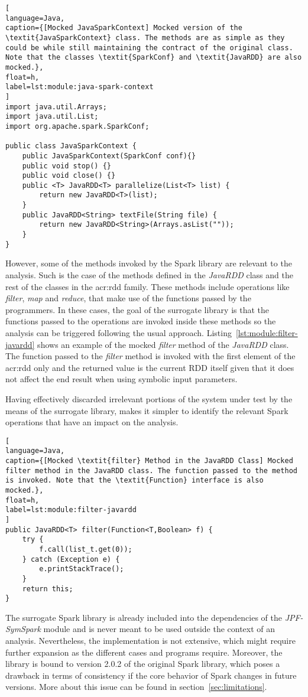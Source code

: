 \begin{lstlisting}[
language=Java,
caption={[Mocked JavaSparkContext] Mocked version of the \textit{JavaSparkContext} class. The methods are as simple as they could be while still maintaining the contract of the original class. Note that the classes \textit{SparkConf} and \textit{JavaRDD} are also mocked.},
float=h,
label=lst:module:java-spark-context
]
import java.util.Arrays;
import java.util.List;
import org.apache.spark.SparkConf;

public class JavaSparkContext {	
	public JavaSparkContext(SparkConf conf){}
	public void stop() {}	
	public void close() {}
	public <T> JavaRDD<T> parallelize(List<T> list) {		
		return new JavaRDD<T>(list);
	}
	public JavaRDD<String> textFile(String file) {
		return new JavaRDD<String>(Arrays.asList(""));
	}
}
\end{lstlisting}

However, some of the methods invoked by the Spark library are relevant to the analysis. Such is the case of the methods defined in the \textit{JavaRDD} class and the rest of the classes in the \acrshort{acr:rdd} family. These methods include operations like \textit{filter}, \textit{map} and \textit{reduce}, that make use of the functions passed by the programmers. In these cases, the goal of the surrogate library is that the functions passed to the operations are invoked inside these methods so the analysis can be triggered following the usual \spf{} approach. Listing~\ref{lst:module:filter-javardd} shows an example of the mocked \textit{filter} method of the \textit{JavaRDD} class. The function passed to the \textit{filter} method is invoked with the first element of the \acrshort{acr:rdd} only and the returned value is the current RDD itself given that it does not affect the end result when using symbolic input parameters.

Having effectively discarded irrelevant portions of the system under test by the means of the surrogate library, makes it simpler to identify the relevant Spark operations that have an impact on the analysis.

\begin{lstlisting}[
language=Java,
caption={[Mocked \textit{filter} Method in the JavaRDD Class] Mocked filter method in the JavaRDD class. The function passed to the method is invoked. Note that the \textit{Function} interface is also mocked.},
float=h,
label=lst:module:filter-javardd
]
public JavaRDD<T> filter(Function<T,Boolean> f) {		
	try {
		f.call(list_t.get(0));
	} catch (Exception e) {
		e.printStackTrace();
	}
	return this;
}
\end{lstlisting}

The surrogate Spark library is already included into the dependencies of the \textit{JPF-SymSpark} module and is never meant to be used outside the context of an analysis. Nevertheless, the implementation is not extensive, which might require further expansion as the different cases and programs require. Moreover, the library is bound to version 2.0.2 of the original Spark library, which poses a drawback in terms of consistency if the core behavior of Spark changes in future versions. More about this issue can be found in section~\ref{sec:limitations}.